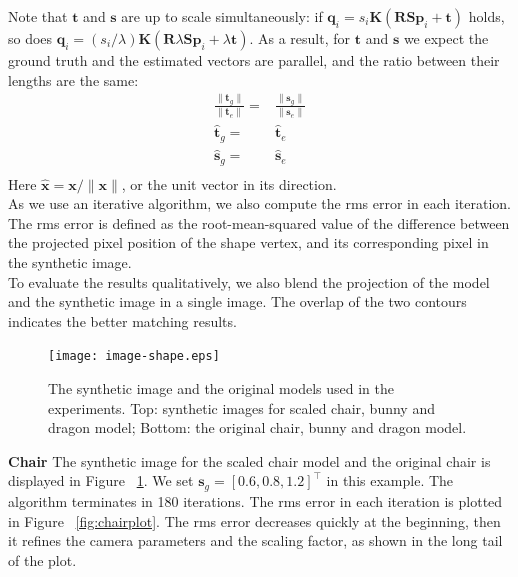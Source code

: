\documentclass[10pt,twocolumn,letterpaper]{article}
\begin{document}
\noindent
Note that $\mathbf{t}$ and $\mathbf{s}$ are up to scale simultaneously: if $\mathbf{q}_i=s_i\mathbf{K}(\mathbf{R}\mathbf{S}\mathbf{p}_i + \mathbf{t})$ holds, so does $\mathbf{q}_i=(s_i/\lambda)\mathbf{K}(\mathbf{R}\lambda\mathbf{S}\mathbf{p}_i + \lambda\mathbf{t})$. As a result, for $\mathbf{t}$ and $\mathbf{s}$ we expect the ground truth and the estimated vectors are parallel, and the ratio between their lengths are the same:
\begin{equation}
\begin{split}
\frac{\|\mathbf{t}_g\|}{\|\mathbf{t}_e\|}=&\frac{\|\mathbf{s}_g\|}{\|\mathbf{s}_e\|}\\
\hat{\mathbf{t}}_g=&\hat{\mathbf{t}}_e\\
\hat{\mathbf{s}}_g=&\hat{\mathbf{s}}_e\\
\end{split}
\end{equation}
Here $\hat{\mathbf{x}}=\mathbf{x}/\|\mathbf{x}\|$, or the unit vector in its direction.\\

\noindent
As we use an iterative algorithm, we also compute the rms error in each iteration. The rms error is defined as the root-mean-squared value of the difference between the projected pixel position of the shape vertex, and its corresponding pixel in the synthetic image.\\

\noindent
To evaluate the results qualitatively, we also blend the projection of the model and the synthetic image in a single image. The overlap of the two contours indicates the better matching results.\\

\begin{figure}
\begin{center}
	\texttt{[image: image-shape.eps]}
\end{center}
   \caption{The synthetic image and the original models used in the experiments. Top: synthetic images for scaled chair, bunny and dragon model; Bottom: the original chair, bunny and dragon model.}
\label{fig:imageshape}
\end{figure}

\noindent
\textbf{Chair} The synthetic image for the scaled chair model and the original chair is displayed in Figure ~\ref{fig:imageshape}. We set $\mathbf{s}_g=[0.6, 0.8, 1.2]^\top$ in this example. The algorithm terminates in 180 iterations. The rms error in each iteration is plotted in Figure ~\ref{fig:chairplot}. The rms error decreases quickly at the beginning, then it refines the camera parameters and the scaling factor, as shown in the long tail of the plot.\\
\end{document}
